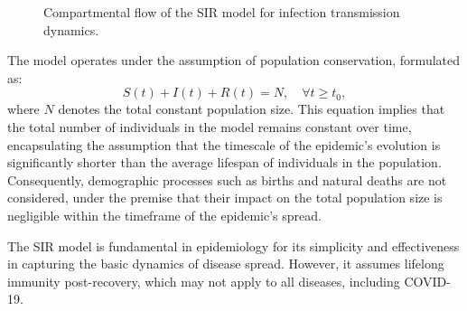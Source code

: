 \documentclass[12pt]{article}
\begin{document}
\begin{figure}[h!]
    \centering
    \caption{Compartmental flow of the SIR model for infection transmission dynamics.}
\end{figure}

The model operates under the assumption of population conservation, formulated as:
\begin{equation}
    S(t) + I(t) + R(t) = N, \quad \forall t \geq t_0,
\end{equation}
where $N$ denotes the total constant population size. This equation implies that the total number of individuals in the model remains constant over time, encapsulating the assumption that the timescale of the epidemic's evolution is significantly shorter than the average lifespan of individuals in the population. Consequently, demographic processes such as births and natural deaths are not considered, under the premise that their impact on the total population size is negligible within the timeframe of the epidemic's spread.

    
The SIR model is fundamental in epidemiology for its simplicity and effectiveness in capturing the basic dynamics of disease spread. However, it assumes lifelong immunity post-recovery, which may not apply to all diseases, including COVID-19.
\end{document}
